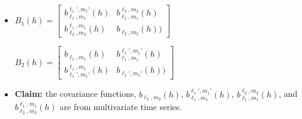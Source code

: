 \documentclass[11pt]{article}
\begin{document}
\begin{itemize}
\item
$B_1(h)= 
\begin{bmatrix}
b_{\ell_1,m_1}^{\ell_1',m_1'}(h) & b_{\ell_1,m_1}^{\ell_2,m_2}(h) \\ 
b_{\ell_2,m_2}^{\ell_1,m_1}(h) & b_{\ell_2,m_2}(h)) 
\end{bmatrix}$

$B_2(h)= 
\begin{bmatrix}
b_{\ell_1,m_1}(h) & b_{\ell_1,m_1}^{\ell_1',m_1'}(h) \\ 
b_{\ell_1',m_1'}^{\ell_1,m_1}(h) & b_{\ell_1',m_1'}(h)) 
\end{bmatrix}$

\item
\textbf{Claim:} the covariance functions, $b_{\ell_2,m_2}(h)$, $b_{\ell_1,m_1}^{\ell_1',m_1'}(h)$, $b_{\ell_1,m_1}^{\ell_2,m_2}(h)$, and $b_{\ell_2,m_2}^{\ell_1,m_1}(h)$ are from multivariate time series.\\


\end{itemize}
\end{document}
